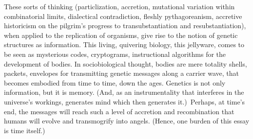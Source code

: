 These sorts of thinking (particlization, accretion,
mutational variation within combinatorial limits, dialectical contradiction,
fleshly pythagoreanism, accretive historicism
on the pilgrim's progress to transubstantiation and resubstantiation), when applied to
the replication of organisms, give rise to the
notion of genetic structures as information.
This living, quivering biology, this jellyware,
comes to be seen as mysterious codes, cryptograms, instructional algorithms for the development of bodies. In sociobiological
thought, bodies are mere totality shells, packets, envelopes for transmitting genetic
messages along a carrier wave, that becomes embodied from time to time, down the ages.
Genetics is not only information, but it is memory.
(And, as an instrumentality that
interferes in the universe's workings, generates mind which then generates it.)\
Perhaps, at time's end, the messages will reach
such a level of accretion and recombination
that humans will evolve and transmogrify
into angels. (Hence, one burden of this essay is time itself.)

